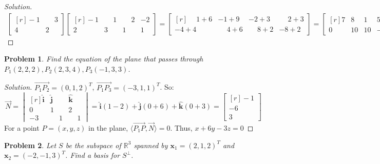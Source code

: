\documentclass[oneside]{book}
\theoremstyle{mystyle}
\newtheorem{problem}{Problem}[section]
\begin{document}
\begin{proof}[Solution]
\begin{align*}
    \begin{bmatrix*}[r] -1 & \phantom{-}3 \\ 4 & 2 \end{bmatrix*} \begin{bmatrix*}[r] -1 & \phantom{-}1 & \phantom{-}2 & -2 \\ 2 & 3 & 1 & 1 \end{bmatrix*}=\begin{bmatrix*}[r] \phantom{-}1+6 & -1+9 & -2+3 & \phantom{-}2+3 \\ -4+4 & \phantom{-}4+6 & \phantom{-}8+2 & -8+2 \end{bmatrix*}=\begin{bmatrix*}[r] 7 & 8 & 1 & 5 \\ 0 & 10 & 10 & -6 \end{bmatrix*}
\end{align*}
\end{proof}
\begin{problem}
Find the equation of the plane that passes through $P_1(2,2,2), P_2(2,3,4), P_3(-1,3,3)$.
\end{problem}
\begin{proof}[Solution]
$\overrightarrow{P_1P_2} = (0,1,2)^{T}$, $\overrightarrow{P_1 P_3} = (-3,1,1)^{T}$. So:
\begin{equation*}
    \overrightarrow{N} = \begin{vmatrix*}[r] \hat{\mathbf{i}} & \hat{\mathbf{j}} & \hat{\mathbf{k}} \\ 0 & 1 & 2 \\ -3 & \phantom{-}1 & \phantom{-}1 \end{vmatrix*} = \hat{\mathbf{i}}(1-2) + \hat{\mathbf{j}}(0+6) + \hat{\mathbf{k}}(0+3)=\begin{bmatrix*}[r]-1 \\ -6 \\ 3\end{bmatrix*}   
\end{equation*}
For a point $P=(x,y,z)$ in the plane, $\langle \overrightarrow{P_1P}, \overrightarrow{N}\rangle = 0$. Thus, $x + 6y - 3z =0$
\end{proof}
\begin{problem}
Let $S$ be the subspace of $\mathbb{R}^3$ spanned by $\mathbf{x}_1 = (2,1,2)^T$ and $\mathbf{x}_2 = (-2,-1,3)^T$. Find a basis for $S^{\perp}$.
\end{problem}
\end{document}
